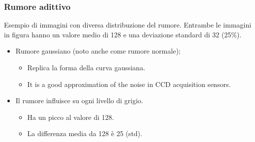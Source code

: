 \documentclass{report}
\begin{document}
\subsubsection{Rumore adittivo}
\label{sec:rumadit}

Esempio di immagini con diversa distribuzione del rumore. Entrambe le
immagini in figura hanno un valore medio di 128 e una deviazione
standard di 32 (25\%).
\begin{itemize}
\item Rumore gaussiano (noto anche come rumore normale);
  \begin{itemize}
  \item Replica la forma della curva gaussiana.
  \item It is a good approximation of the noise in CCD acquisition
    sensors.
  \end{itemize}
\item Il rumore influisce su ogni livello di grigio.
  \begin{itemize}
  \item Ha un picco al valore di 128.
  \item La differenza media da 128 è 25 (std).
  \end{itemize}
\end{itemize}
\end{document}
